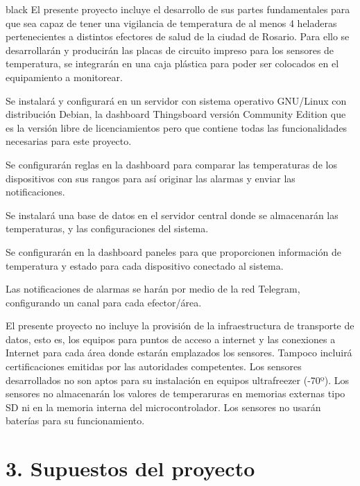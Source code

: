 \documentclass[11pt]{charter}
\begin{document}
\begin{consigna}{black}
El presente proyecto incluye el desarrollo de sus partes fundamentales para que sea capaz de tener una vigilancia de temperatura de al menos 4 heladeras pertenecientes a distintos efectores de salud de la ciudad de Rosario. 
Para ello se desarrollarán y producirán las placas de circuito impreso para los sensores de temperatura, se integrarán en una caja plástica para poder ser colocados en el equipamiento a monitorear.

Se instalará y configurará en un servidor con sistema operativo GNU/Linux con distribución Debian, la dashboard Thingsboard versión Community Edition que es la versión libre de licenciamientos pero que contiene todas las funcionalidades necesarias para este proyecto.

Se configurarán reglas en la dashboard para comparar las temperaturas de los dispositivos con sus rangos para así originar las alarmas y enviar las notificaciones.

Se instalará una base de datos en el servidor central donde se almacenarán las temperaturas, y las configuraciones del sistema.

Se configurarán en la dashboard paneles para que proporcionen información de temperatura y estado para cada dispositivo conectado al sistema.

Las notificaciones de alarmas se harán por medio de la red Telegram, configurando un canal para cada efector/área.


El presente proyecto no incluye la provisión de la infraestructura de transporte de datos, esto es, los equipos para puntos de acceso a internet y las conexiones a Internet para cada área donde estarán emplazados los sensores. Tampoco incluirá certificaciones emitidas por las autoridades competentes.
Los sensores desarrollados no son aptos para su instalación en equipos ultrafreezer (-70º).
Los sensores no almacenarán los valores de temperaruras en memorias externas tipo SD ni en la memoria interna del microcontrolador.
Los sensores no usarán baterías para su funcionamiento.

\end{consigna}


\section{3. Supuestos del proyecto}
\label{sec:supuestos}
\end{document}
